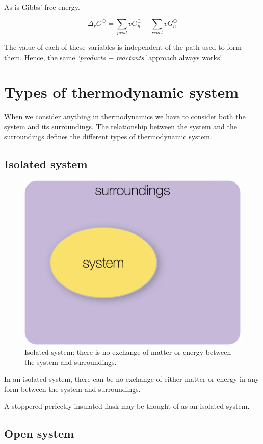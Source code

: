 \documentclass[
]{book}
\begin{document}
As is Gibbs' free energy.

\begin{equation}
\Delta _ r G^\ominus = \sum_{prod} v G_n^\ominus - \sum_{react} v  G_n^\ominus 
\label{eq:Gibbsstate}
\end{equation}

The value of each of these variables is independent of the path used to form them. Hence, the same \emph{`products − reactants'} approach always works!

\hypertarget{sec:typesofsystem}{%
\section{Types of thermodynamic system}\label{sec:typesofsystem}}

When we consider anything in thermodynamics we have to consider both the system and its surroundings. The relationship between the system and the surroundings defines the different types of thermodynamic system.

\hypertarget{subsec:isolated}{%
\subsection{Isolated system}\label{subsec:isolated}}

\begin{figure}

{\centering \includegraphics[width=0.3\linewidth]{images/isolated} 

}

\caption{Isolated system: there is no exchange of matter or energy between the system and surroundings.}\label{fig:isolated}
\end{figure}

In an isolated system, there can be no exchange of either matter or energy in any form between the system and surroundings.

A stoppered perfectly insulated flask may be thought of as an isolated system.

\hypertarget{subsec:open}{%
\subsection{Open system}\label{subsec:open}}
\end{document}
